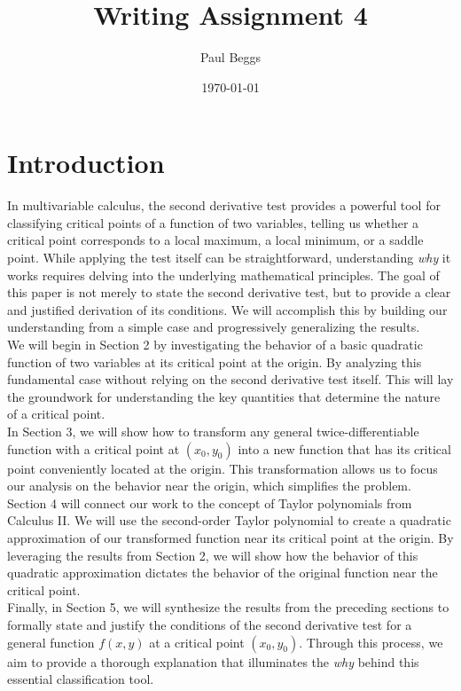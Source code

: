 \documentclass{article}
\title{Writing Assignment 4}
\author{Paul Beggs}
\date{\today}
\begin{document}
\maketitle

\section{Introduction}

In multivariable calculus, the second derivative test provides a powerful tool for classifying critical points of a function of two variables, telling us whether a critical point corresponds to a local maximum, a local minimum, or a saddle point. While applying the test itself can be straightforward, understanding \textit{why} it works requires delving into the underlying mathematical principles. The goal of this paper is not merely to state the second derivative test, but to provide a clear and justified derivation of its conditions. We will accomplish this by building our understanding from a simple case and progressively generalizing the results. \\

We will begin in Section 2 by investigating the behavior of a basic quadratic function of two variables at its critical point at the origin. By analyzing this fundamental case without relying on the second derivative test itself. This will lay the groundwork for understanding the key quantities that determine the nature of a critical point. \\

In Section 3, we will show how to transform any general twice-differentiable function with a critical point at \( (x_0, y_0) \) into a new function that has its critical point conveniently located at the origin. This transformation allows us to focus our analysis on the behavior near the origin, which simplifies the problem. \\

Section 4 will connect our work to the concept of Taylor polynomials from Calculus II. We will use the second-order Taylor polynomial to create a quadratic approximation of our transformed function near its critical point at the origin. By leveraging the results from Section 2, we will show how the behavior of this quadratic approximation dictates the behavior of the original function near the critical point. \\

Finally, in Section 5, we will synthesize the results from the preceding sections to formally state and justify the conditions of the second derivative test for a general function \( f(x,y) \) at a critical point \( (x_0, y_0) \). Through this process, we aim to provide a thorough explanation that illuminates the \textit{why} behind this essential classification tool. \\
\end{document}

